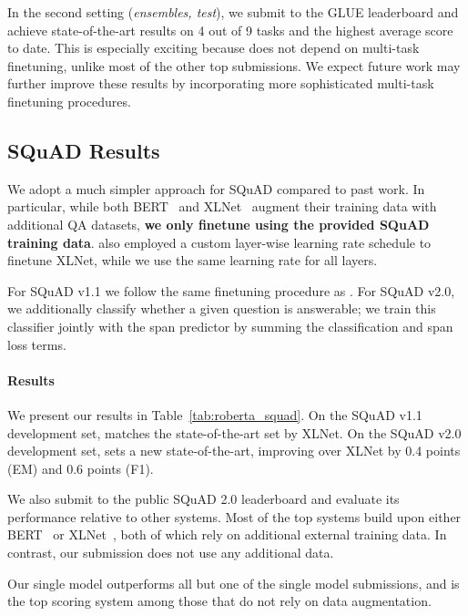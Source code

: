 In the second setting (\emph{ensembles, test}), we submit \ourmodel{} to the GLUE leaderboard and achieve state-of-the-art results on 4 out of 9 tasks and the highest average score to date.
This is especially exciting because \ourmodel{} does not depend on multi-task finetuning, unlike most of the other top submissions.
We expect future work may further improve these results by incorporating more sophisticated multi-task finetuning procedures.

\subsection{SQuAD Results} \label{sec:results_squad}

We adopt a much simpler approach for SQuAD compared to past work.
In particular, while both BERT~\cite{devlin2018bert} and XLNet~\cite{yang2019xlnet} augment their training data with additional QA datasets, \textbf{we only finetune \ourmodel{} using the provided SQuAD training data}.
 also employed a custom layer-wise learning rate schedule to finetune XLNet, while we use the same learning rate for all layers.

For SQuAD v1.1 we follow the same finetuning procedure as .
For SQuAD v2.0, we additionally classify whether a given question is answerable; we train this classifier jointly with the span predictor by summing the classification and span loss terms.

\paragraph{Results}



We present our results in Table~\ref{tab:roberta_squad}.
On the SQuAD v1.1 development set, \ourmodel{} matches the state-of-the-art set by XLNet.
On the SQuAD v2.0 development set, \ourmodel{} sets a new state-of-the-art, improving over XLNet by 0.4 points (EM) and 0.6 points (F1).

We also submit \ourmodel{} to the public SQuAD 2.0 leaderboard and evaluate its performance relative to other systems.
Most of the top systems build upon either BERT~\cite{devlin2018bert} or XLNet~\cite{yang2019xlnet}, both of which rely on additional external training data.
In contrast, our submission does not use any additional data.

Our single \ourmodel{} model outperforms all but one of the single model submissions, and is the top scoring system among those that do not rely on data augmentation.

